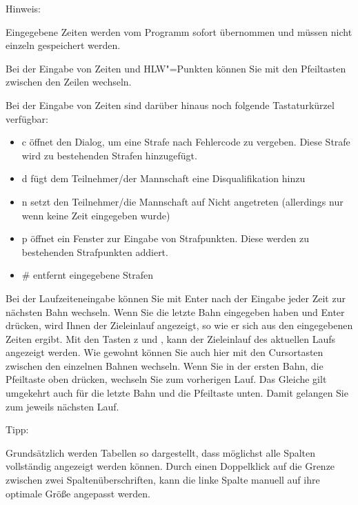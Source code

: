 \documentclass[11pt,a4paper,twoside,ngerman]{article}
\begin{document}
\begin{bfseries}Hinweis:\end{bfseries} Eingegebene Zeiten werden vom Programm sofort übernommen und müssen nicht einzeln gespeichert werden.

Bei der Eingabe von Zeiten und HLW"=Punkten können Sie mit den Pfeiltasten zwischen den Zeilen wechseln.

Bei der Eingabe von Zeiten sind darüber hinaus noch folgende Tastaturkürzel verfügbar:
\begin{itemize}

\item \glqq{}c\grqq{} öffnet den Dialog, um eine Strafe nach Fehlercode zu vergeben. Diese Strafe wird zu bestehenden Strafen hinzugefügt.


\item \glqq{}d\grqq{} fügt dem Teilnehmer/der Mannschaft eine \glqq{}Disqualifikation\grqq{} hinzu


\item \glqq{}n\grqq{} setzt den Teilnehmer/die Mannschaft auf \glqq{}Nicht angetreten\grqq{} (allerdings nur wenn keine Zeit eingegeben wurde)


\item \glqq{}p\grqq{} öffnet ein Fenster zur Eingabe von Strafpunkten. Diese werden zu bestehenden Strafpunkten addiert.


\item \glqq{}\#\grqq{} entfernt eingegebene Strafen


\end{itemize}


Bei der Laufzeiteneingabe können Sie mit \glqq{}Enter\grqq{} nach der Eingabe jeder Zeit zur nächsten Bahn wechseln. Wenn Sie die letzte Bahn eingegeben haben und \glqq{}Enter\grqq{} drücken, wird Ihnen der Zieleinlauf angezeigt, so wie er sich aus den eingegebenen Zeiten ergibt. Mit den Tasten \glqq{}z\grqq{} und \glqq{},\grqq{} kann der Zieleinlauf des aktuellen Laufs angezeigt werden. Wie gewohnt können Sie auch hier mit den Cursortasten zwischen den einzelnen Bahnen wechseln. Wenn Sie in der ersten Bahn, die Pfeiltaste oben drücken, wechseln Sie zum vorherigen Lauf. Das Gleiche gilt umgekehrt auch für die letzte Bahn und die Pfeiltaste unten. Damit gelangen Sie zum jeweils nächsten Lauf.

\begin{bfseries}Tipp:\end{bfseries} Grundsätzlich werden Tabellen so dargestellt, dass möglichst alle Spalten vollständig angezeigt werden können. Durch einen Doppelklick auf die Grenze zwischen zwei Spaltenüberschriften, kann die linke Spalte manuell auf ihre optimale Größe angepasst werden.
\end{document}
